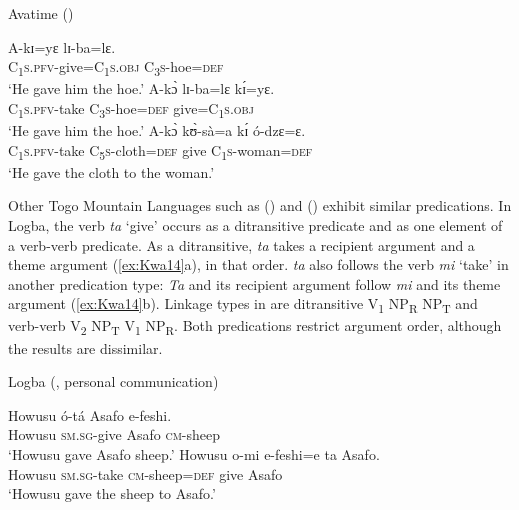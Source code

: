 \documentclass[output=paper,colorlinks,citecolor=brown]{langscibook}
\begin{document}
\ea \label{ex:Kwa13} Avatime (\citealt[42-42, 57]{Defina2016})
\begin{xlist}
\ex
\gll A-kɪ=yɛ	lɪ-ba=lɛ.\\
C\textsubscript{1}\textsc{s}.\textsc{pfv}-give=C\textsubscript{1}\textsc{s.obj}	C\textsubscript{3}\textsc{s}-hoe=\textsc{def}\\
\glt 	‘He gave him the hoe.’
\ex
\gll A-kɔ̀	lɪ-ba=lɛ		kɪ́=yɛ.\\
C\textsubscript{1}\textsc{s.pfv}-take		C\textsubscript{3}\textsc{s}-hoe=\textsc{def}		give=C\textsubscript{1}\textsc{s.obj}\\
\glt			‘He gave him the hoe.’
\ex	
\gll A-kɔ̀	kʊ̀-sà=a					kɪ́ ó-dzɛ=ɛ.\\
	C\textsubscript{1}\textsc{s.pfv}-take	C\textsubscript{5}\textsc{s}-cloth=\textsc{def}		give		C\textsubscript{1}\textsc{s}-woman=\textsc{def}\\
\glt 	‘He gave the cloth to the woman.’
\end{xlist}
\z

Other Togo Mountain Languages such as  (\cite{Dorvlo2008}) and  (\cite{Bobuafor2013}) exhibit similar predications. In Logba, the verb \textit{ta} ‘give’ occurs as a ditransitive predicate and as one element of a verb-verb predicate. As a ditransitive, \textit{ta} takes a recipient argument and a theme argument (\ref{ex:Kwa14}a), in that order. \textit{ta} also follows the verb \textit{mi} ‘take’ in another predication type: \textit{Ta} and its recipient argument follow \textit{mi} and its theme argument (\ref{ex:Kwa14}b). Linkage types in  are ditransitive V\textsubscript{1} NP\textsubscript{R} NP\textsubscript{T} and verb-verb V\textsubscript{2} NP\textsubscript{T} V\textsubscript{1} NP\textsubscript{R}. Both predications restrict argument order,   although the results are dissimilar.

\ea \label{ex:Kwa14} Logba (\citealt[137]{Dorvlo2008}, personal communication)
\begin{xlist}
\ex
\gll Howusu		ó-tá							Asafo			e-feshi.\\
	Howusu		\textsc{sm.sg}-give		Asafo			\textsc{cm}-sheep\\
\glt ‘Howusu gave Asafo sheep.’
\ex	
\gll Howusu		o-mi	e-feshi=e				ta			Asafo.\\
	Howusu		\textsc{sm.sg}-take		\textsc{cm}-sheep=\textsc{def}		give		Asafo \\
\glt	‘Howusu gave the sheep to Asafo.’
\end{xlist}
\z
\end{document}

